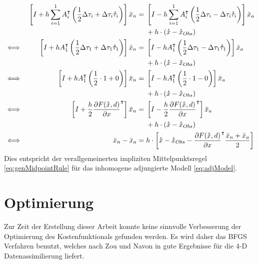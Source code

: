 \begin{align*}
&& \left[I +h\sum_{i=1}^1 A_i^\intercal \left(\frac{1}{2} \Delta \tau_i +\Delta \tau_i \mathring{\tau}_i\right) \right]\bar{x}_n &=\begin{aligned}[t]
   & \left[I - h\sum_{i=1}^1 A_i^\intercal  \left(\frac{1}{2}\Delta \tau_i-\Delta \tau_i \mathring{\tau}_i\right)\right]\bar{x}_a  \\
	&+	h\cdot (\mathring{x} -\mathring{x}_{Obs}) 
       \end{aligned} \\
\iff &&  \left[I +h A_1^\intercal \left(\frac{1}{2} \Delta \tau_1 +\Delta \tau_1 \mathring{\tau}_1\right) \right]\bar{x}_n &= 
  \begin{aligned}[t]	
&\left[I - h A_1^\intercal  \left(\frac{1}{2}\Delta \tau_1-\Delta \tau_1 \mathring{\tau}_1\right)\right]\bar{x}_a  \\
&+h\cdot (\mathring{x} -\mathring{x}_{Obs})
  \end{aligned} \\
\iff &&  \left[I +h A_1^\intercal \left(\frac{1}{2} \cdot 1+0\right) \right]\bar{x}_n &= \begin{aligned}[t]
&\left[I - h A_1^\intercal  \left(\frac{1}{2} \cdot 1-0\right)\right]\bar{x}_a \\
&+h\cdot (\mathring{x} -\mathring{x}_{Obs})                                                                                  
\end{aligned}\\
\iff &&  \left[ I +\frac{h}{2} \frac{\partial F(\mathring{x} ,d)}{\partial x}^\intercal \right]\bar{x}_n &= 
\begin{aligned}[t]
&\left[ I - \frac{h}{2}  \frac{\partial F(\mathring{x} ,d)}{\partial x}^\intercal  \right]\bar{x}_a \\
&+h\cdot (\mathring{x} -\mathring{x}_{Obs})\\
\end{aligned}\\
\iff &&  \bar{x}_n - \bar{x}_a &=h\cdot \left[\mathring{x} -\mathring{x}_{Obs} - \frac{\partial F(\mathring{x} ,d)}{\partial x}^\intercal  \frac{\bar{x}_n + \bar{x}_a}{2}\right]\\
\end{align*}
Dies entspricht der verallgemeinerten impliziten Mittelpunktsregel \eqref{eq:genMidpointRule} für das inhomogene adjungierte Modell \eqref{eq:adjModel}.
 

 
\section{Optimierung}
 Zur Zeit der Erstellung dieser Arbeit konnte keine sinnvolle Verbesserung der Optimierung des Kostenfunktionals gefunden werden. Es wird daher das BFGS Verfahren benutzt, welches nach Zou und Navon in \cite{zou1993numerical} gute Ergebnisse für die 4-D Datenassimilierung liefert. 